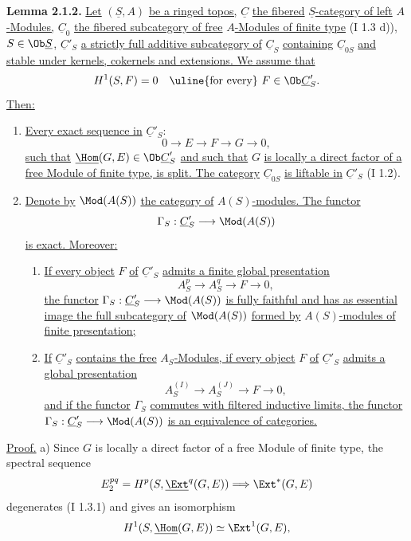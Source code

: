 \textbf{Lemma 2.1.2.} \uline{Let} $(\underline{S},A)$ \uline{be a ringed topos,} $\underline{C}$ \uline{the fibered} $\underline{S}$\uline{-category of left} $A$\uline{-Modules,} $\underline{C}_0$ \uline{the fibered subcategory of free} $A$\uline{-Modules of finite type} (I 1.3 d)), $S\in\Ob \underline{S}$, $\underline{C}'_S$ \uline{a strictly full additive subcategory of} $\underline{C}_S$ \uline{containing} $\underline{C}_{0S}$ \uline{and stable under kernels, cokernels and extensions. We assume that}
%
\[
H^1(S,F)=0\quad
\text{\uline{for every} }F\in\Ob\underline{C}'_S.
\]
\uline{Then:}
\begin{enumerate}[label=\alph*)]
\item \uline{Every exact sequence in} $\underline{C}'_S$:
\[
0\longrightarrow E\longrightarrow F\longrightarrow G\longrightarrow0,
\]
\uline{such that} $\underline{\Hom}(G,E)
\in\Ob\underline{C}'_S$ \uline{and such that} $G$ \uline{is locally a direct factor of a free Module of finite type, is split. The category} $\underline{C}_{0S}$ \uline{is liftable in} $\underline{C}'_S$ (I 1.2).
\item \uline{Denote by} $\Mod(A(S))$ \uline{the category of} $A(S)$\uline{-modules. The functor}
\[
\Gamma_S:\underline{C}'_S\longrightarrow\Mod(A(S))
\]
\uline{is exact. Moreover:}
\begin{enumerate}[label=(\roman*)]
\item \uline{If every object} $F$ \uline{of} $\underline{C}'_S$ \uline{admits a finite global presentation}
\[
A_S^p\longrightarrow A_S^q\longrightarrow F\longrightarrow0,
\]
\uline{the functor} $\Gamma_S:\underline{C}'_S\longrightarrow\Mod(A(S))$ \uline{is fully faithful and has as essential image the full subcategory of} $\Mod(A(S))$ \uline{formed by} $A(S)$\uline{-modules of finite presentation;}
\item \uline{If} $\underline{C}'_S$ \uline{contains the free} $A_S$\uline{-Modules, if every object} $F$ \uline{of} $\underline{C}'_S$ \uline{admits a global presentation}
\[
A_S^{(I)}\longrightarrow A_S^{(J)}\longrightarrow F\longrightarrow0,
\]
\uline{and if the functor} $\Gamma_S$ \uline{commutes with filtered inductive limits}\uline{, the functor} $\Gamma_S:\underline{C}'_S\longrightarrow\Mod(A(S))$ \uline{is an equivalence of categories.}
\end{enumerate}
\end{enumerate}

\uline{Proof.} a) Since $G$ is locally a direct factor of a free Module of finite type, the spectral sequence
\[
E_2^{pq}=H^p(S,\underline{\Ext}^q(G,E))\Longrightarrow\Ext^{*}(G,E)
\]
degenerates (I 1.3.1) and gives an isomorphism
\[
H^1(S,\underline{\Hom}(G,E))\simeq\Ext^1(G,E),
\]
